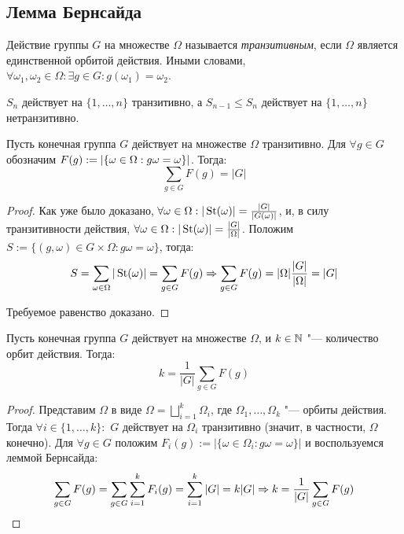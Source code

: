 \subsection{Лемма Бернсайда}

\begin{definition}
	Действие группы $G$ на множестве $\Omega$ называется \textit{транзитивным}, если $\Omega$ является единственной орбитой действия. Иными словами, $\forall \omega_1, \omega_2 \in \Omega: \exists g \in G: g(\omega_1) = \omega_2$.
\end{definition}

\begin{example}
	$S_n$ действует на $\{1, \dotsc, n\}$ транзитивно, а $S_{n-1} \le S_n$ действует на $\{1, \dotsc, n\}$ нетранзитивно.
\end{example}

\begin{theorem}
	Пусть конечная группа $G$ действует на множестве $\Omega$ транзитивно. Для $\forall g \in G$ обозначим $F(g) := |\{\omega \hm\in \Omega: g\omega = \omega\}|$. Тогда:
	\[\sum\limits_{g \in G}F(g) = |G|\]
\end{theorem}

\begin{proof}
	Как уже было доказано, $\forall \omega \in \Omega: |\operatorname{St}(\omega)| = \frac{|G|}{|G(\omega)|}$, и, в силу транзитивности действия, $\forall \omega \in \Omega: |\operatorname{St}(\omega)| = \frac{|G|}{|\Omega|}$. Положим $S := \{(g, \omega) \in G \times \Omega: g\omega = \omega\}$, тогда:
	\[S = \sum\limits_{\omega \in \Omega}|\operatorname{St}(\omega)| = \sum\limits_{g \in G}F(g) \Rightarrow \sum\limits_{g \in G}F(g) = |\Omega|\frac{|G|}{|\Omega|} = |G|\]
	
	Требуемое равенство доказано.
\end{proof}

\begin{corollary}
	Пусть конечная группа $G$ действует на множестве $\Omega$, и $k \in \mathbb{N}$ "--- количество орбит действия. Тогда:
	\[k = \frac1{|G|}\sum\limits_{g \in G}F(g)\]
\end{corollary}

\begin{proof}
	Представим $\Omega$ в виде $\Omega = \bigsqcup_{i = 1}^k\Omega_i$, где $\Omega_1, \dotsc, \Omega_k$ "--- орбиты действия. Тогда $\forall i \in \{1, \dotsc, k\}:$ $G$ действует на $\Omega_i$ транзитивно (значит, в частности, $\Omega$ конечно). Для $\forall g \in G$ положим $F_i(g) := |\{\omega \in \Omega_i: g\omega = \omega\}|$ и воспользуемся леммой Бернсайда:
	\[\sum\limits_{g \in G}F(g) = \sum\limits_{g \in G}\sum\limits_{i = 1}^kF_i(g) = \sum\limits_{i = 1}^k|G| = k|G| \Rightarrow k = \frac1{|G|}\sum\limits_{g \in G}F(g)\]
\end{proof}


